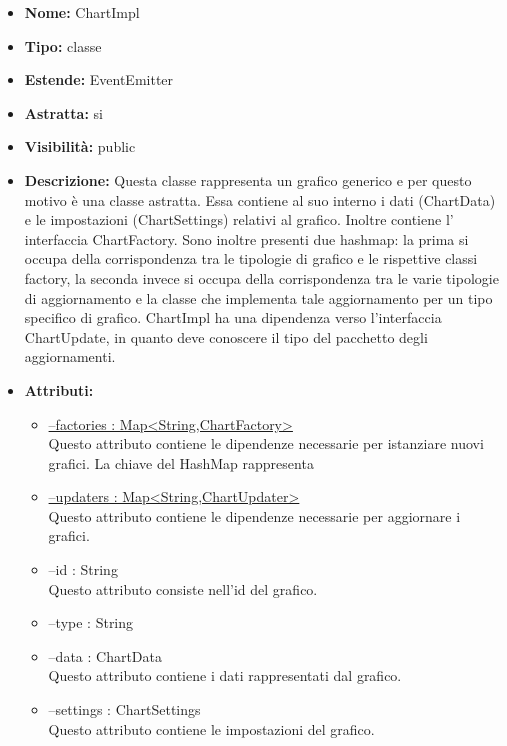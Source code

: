 			
			\begin{itemize}
			\item \textbf{Nome:} ChartImpl
			\item \textbf{Tipo:} classe
			
		\item \textbf{Estende:}
		EventEmitter
		\item \textbf{Astratta:}
		si
			\item \textbf{Visibilità:} public
			\item \textbf{Descrizione:} Questa classe rappresenta un grafico generico e per questo motivo è una classe astratta. Essa contiene al suo interno i dati (ChartData) e le impostazioni (ChartSettings) relativi al grafico. Inoltre contiene l' interfaccia ChartFactory. Sono inoltre presenti due hashmap: la prima si occupa della corrispondenza tra le tipologie di grafico e le rispettive classi factory, la seconda invece si occupa della corrispondenza tra le varie tipologie di aggiornamento e la classe che implementa tale aggiornamento per un tipo specifico di grafico. ChartImpl ha una dipendenza verso l'interfaccia ChartUpdate, in quanto deve conoscere il tipo del pacchetto degli aggiornamenti.
			\item \textbf{Attributi:}
				\begin{itemize}
				\setlength{\itemsep}{5pt}
				
					\item[\ding{111}] \underline{--factories : Map<String,ChartFactory>} \\ [1mm] Questo attributo contiene le dipendenze necessarie per istanziare nuovi grafici. La chiave del HashMap rappresenta
					\item[\ding{111}] \underline{--updaters : Map<String,ChartUpdater>} \\ [1mm] Questo attributo contiene le dipendenze necessarie per aggiornare i grafici.
					\item[\ding{111}] {--id : String} \\ [1mm] Questo attributo consiste nell'id del grafico.
					\item[\ding{111}] {--type : String}
					\item[\ding{111}] {--data : ChartData} \\ [1mm] Questo attributo contiene i dati rappresentati dal grafico.
					\item[\ding{111}] {--settings : ChartSettings} \\ [1mm] Questo attributo contiene le impostazioni del grafico.
				\end{itemize}
		

\end{itemize}

